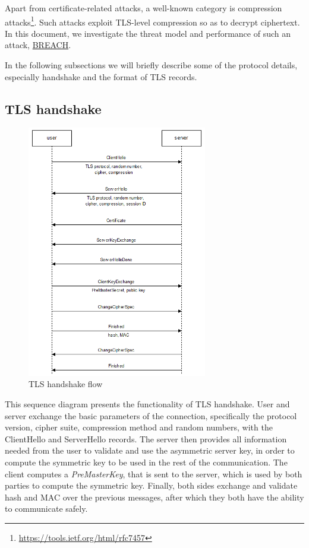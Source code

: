 Apart from certificate-related attacks, a well-known category is compression
attacks\footnote{\url{https://tools.ietf.org/html/rfc7457}}. Such attacks
exploit TLS-level compression so as to decrypt ciphertext. In this document, we
investigate the threat model and performance of such an attack,
\href{http://breachattack.com}{BREACH}.

In the following subsections we will briefly describe some of the protocol
details, especially handshake and the format of TLS records.

\subsection{TLS handshake}

\begin{figure}[H] \caption{TLS handshake flow} \centering
\includegraphics[width=0.7\textwidth]{diagrams/tls_handshake.png}\end{figure}

This sequence diagram presents the functionality of TLS handshake. User and
server exchange the basic parameters of the connection, specifically the
protocol version, cipher suite, compression method and random numbers, with the
ClientHello and ServerHello records. The server then provides all information
needed from the user to validate and use the asymmetric server key, in order to
compute the symmetric key to be used in the rest of the communication. The
client computes a \textit{PreMasterKey}, that is sent to the server, which is
used by both parties to compute the symmetric key. Finally, both sides exchange
and validate hash and MAC over the previous messages, after which they both have
the ability to communicate safely.

